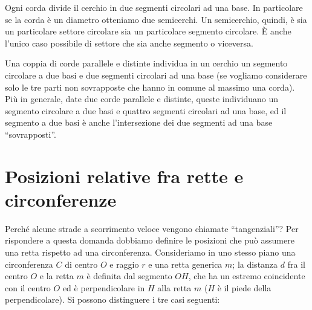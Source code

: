 Ogni corda divide il cerchio in due segmenti circolari ad una base. 
In particolare se la corda è un diametro otteniamo due semicerchi.
Un semicerchio, quindi, è sia un particolare settore circolare sia un 
particolare segmento circolare. \`E anche l'unico caso possibile di 
settore che sia anche segmento o viceversa.

\noindent\begin{minipage}{0.5\textwidth}\parindent15pt
Una coppia di corde parallele e distinte individua in un cerchio un segmento 
circolare a due basi e due segmenti circolari ad una base (se 
vogliamo considerare solo le tre parti non sovrapposte che hanno in 
comune al massimo una corda). Più in generale, date due corde 
parallele e distinte, queste individuano un segmento circolare a due 
basi e quattro segmenti circolari ad una base, ed il segmento a due 
basi è anche l'intersezione dei due segmenti ad una base 
``sovrapposti''.
\end{minipage}\hfil
\begin{minipage}{0.5\textwidth}
  \centering
\end{minipage}

\section{Posizioni relative fra rette e 
circonferenze}\label{sect:posizioni_rette_circonferenze}

Perché alcune strade a scorrimento veloce vengono chiamate 
``tangenziali''?
Per rispondere a questa domanda dobbiamo definire le posizioni che 
può assumere una retta rispetto ad una circonferenza.
Consideriamo in uno stesso piano una circonferenza $C$ di centro $O$ 
e raggio $r$ e una retta generica $m$; la distanza $d$ fra il centro 
$O$ e la retta $m$ è definita dal segmento $OH$, che ha un estremo 
coincidente con il centro $O$ ed è perpendicolare in $H$ alla retta 
$m$ ($H$ è il piede della perpendicolare). Si possono distinguere i 
tre casi seguenti:\vspace{4pt}

